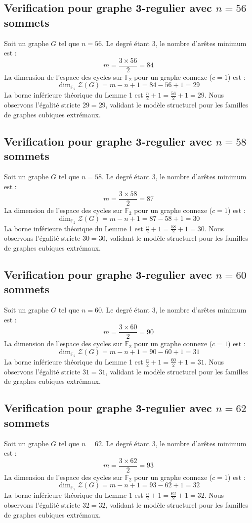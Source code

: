 \documentclass[11pt,a4paper]{article}
\begin{document}
\subsection{Verification pour graphe 3-regulier avec $n=56$ sommets}
Soit un graphe $G$ tel que $n = 56$. Le degré étant 3, le nombre d'arêtes minimum est :
$$ m = \frac{3 \times 56}{2} = 84 $$
La dimension de l'espace des cycles sur $\mathbb{F}_2$ pour un graphe connexe ($c=1$) est :
$$ \dim_{\mathbb{F}_2} \mathcal{Z}(G) = m - n + 1 = 84 - 56 + 1 = 29 $$
La borne inférieure théorique du Lemme 1 est $\frac{n}{2} + 1 = \frac{56}{2} + 1 = 29$.
Nous observons l'égalité stricte $29 = 29$, validant le modèle structurel pour les familles de graphes cubiques extrémaux.

\subsection{Verification pour graphe 3-regulier avec $n=58$ sommets}
Soit un graphe $G$ tel que $n = 58$. Le degré étant 3, le nombre d'arêtes minimum est :
$$ m = \frac{3 \times 58}{2} = 87 $$
La dimension de l'espace des cycles sur $\mathbb{F}_2$ pour un graphe connexe ($c=1$) est :
$$ \dim_{\mathbb{F}_2} \mathcal{Z}(G) = m - n + 1 = 87 - 58 + 1 = 30 $$
La borne inférieure théorique du Lemme 1 est $\frac{n}{2} + 1 = \frac{58}{2} + 1 = 30$.
Nous observons l'égalité stricte $30 = 30$, validant le modèle structurel pour les familles de graphes cubiques extrémaux.

\subsection{Verification pour graphe 3-regulier avec $n=60$ sommets}
Soit un graphe $G$ tel que $n = 60$. Le degré étant 3, le nombre d'arêtes minimum est :
$$ m = \frac{3 \times 60}{2} = 90 $$
La dimension de l'espace des cycles sur $\mathbb{F}_2$ pour un graphe connexe ($c=1$) est :
$$ \dim_{\mathbb{F}_2} \mathcal{Z}(G) = m - n + 1 = 90 - 60 + 1 = 31 $$
La borne inférieure théorique du Lemme 1 est $\frac{n}{2} + 1 = \frac{60}{2} + 1 = 31$.
Nous observons l'égalité stricte $31 = 31$, validant le modèle structurel pour les familles de graphes cubiques extrémaux.

\subsection{Verification pour graphe 3-regulier avec $n=62$ sommets}
Soit un graphe $G$ tel que $n = 62$. Le degré étant 3, le nombre d'arêtes minimum est :
$$ m = \frac{3 \times 62}{2} = 93 $$
La dimension de l'espace des cycles sur $\mathbb{F}_2$ pour un graphe connexe ($c=1$) est :
$$ \dim_{\mathbb{F}_2} \mathcal{Z}(G) = m - n + 1 = 93 - 62 + 1 = 32 $$
La borne inférieure théorique du Lemme 1 est $\frac{n}{2} + 1 = \frac{62}{2} + 1 = 32$.
Nous observons l'égalité stricte $32 = 32$, validant le modèle structurel pour les familles de graphes cubiques extrémaux.
\end{document}
